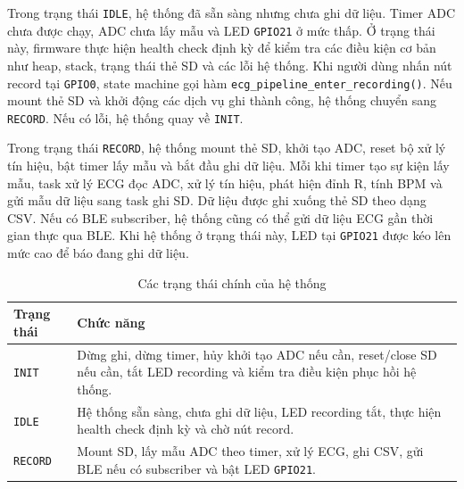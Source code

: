 Trong trạng thái \texttt{IDLE}, hệ thống đã sẵn sàng nhưng chưa ghi dữ liệu.
Timer ADC chưa được chạy, ADC chưa lấy mẫu và LED \texttt{GPIO21} ở mức thấp.
Ở trạng thái này, firmware thực hiện health check định kỳ để kiểm tra các điều
kiện cơ bản như heap, stack, trạng thái thẻ SD và các lỗi hệ thống. Khi người
dùng nhấn nút record tại \texttt{GPIO0}, state machine gọi hàm
\texttt{ecg\_pipeline\_enter\_recording()}. Nếu mount thẻ SD và khởi động các
dịch vụ ghi thành công, hệ thống chuyển sang \texttt{RECORD}. Nếu có lỗi, hệ
thống quay về \texttt{INIT}.

Trong trạng thái \texttt{RECORD}, hệ thống mount thẻ SD, khởi tạo ADC, reset
bộ xử lý tín hiệu, bật timer lấy mẫu và bắt đầu ghi dữ liệu. Mỗi khi timer tạo
sự kiện lấy mẫu, task xử lý ECG đọc ADC, xử lý tín hiệu, phát hiện đỉnh R, tính
BPM và gửi mẫu dữ liệu sang task ghi SD. Dữ liệu được ghi xuống thẻ SD theo
dạng CSV. Nếu có BLE subscriber, hệ thống cũng có thể gửi dữ liệu ECG gần thời
gian thực qua BLE. Khi hệ thống ở trạng thái này, LED tại \texttt{GPIO21} được
kéo lên mức cao để báo đang ghi dữ liệu.

\begin{table}[H]
    \centering
    \caption{Các trạng thái chính của hệ thống}
    \label{tab:system_states}
    \begin{tabular}{|p{3cm}|p{10cm}|}
        \hline
        \textbf{Trạng thái} & \textbf{Chức năng} \\
        \hline
        \texttt{INIT} &
        Dừng ghi, dừng timer, hủy khởi tạo ADC nếu cần, reset/close SD nếu cần,
        tắt LED recording và kiểm tra điều kiện phục hồi hệ thống. \\
        \hline
        \texttt{IDLE} &
        Hệ thống sẵn sàng, chưa ghi dữ liệu, LED recording tắt, thực hiện health
        check định kỳ và chờ nút record. \\
        \hline
        \texttt{RECORD} &
        Mount SD, lấy mẫu ADC theo timer, xử lý ECG, ghi CSV, gửi BLE nếu có
        subscriber và bật LED \texttt{GPIO21}. \\
        \hline
    \end{tabular}
\end{table}

